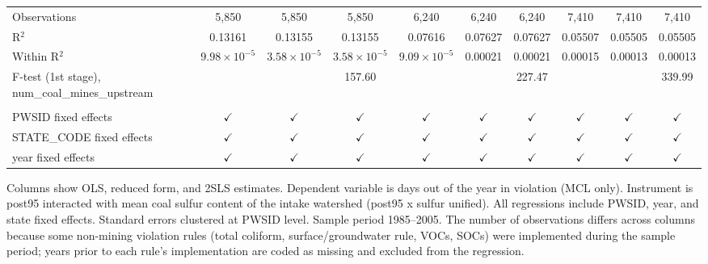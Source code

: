 \begin{table}[htbp]
\begin{adjustbox}{width = \textwidth, center}
\begin{tabular}{lccccccccc}
         Observations                                      & 5,850                 & 5,850                 & 5,850                 & 6,240                 & 6,240         & 6,240         & 7,410         & 7,410         & 7,410\\  
         R$^2$                                             & 0.13161               & 0.13155               & 0.13155               & 0.07616               & 0.07627       & 0.07627       & 0.05507       & 0.05505       & 0.05505\\  
         Within R$^2$                                      & $9.98\times 10^{-5}$  & $3.58\times 10^{-5}$  & $3.58\times 10^{-5}$  & $9.09\times 10^{-5}$  & 0.00021       & 0.00021       & 0.00015       & 0.00013       & 0.00013\\  
         F-test (1st stage), num\_coal\_mines\_upstream    &                       &                       & 157.60                &                       &               & 227.47        &               &               & 339.99\\  
         
          \\
         
         PWSID fixed effects                               & $\checkmark$          & $\checkmark$          & $\checkmark$          & $\checkmark$          & $\checkmark$  & $\checkmark$  & $\checkmark$  & $\checkmark$  & $\checkmark$\\   
         STATE\_CODE fixed effects                         & $\checkmark$          & $\checkmark$          & $\checkmark$          & $\checkmark$          & $\checkmark$  & $\checkmark$  & $\checkmark$  & $\checkmark$  & $\checkmark$\\   
         year fixed effects                                & $\checkmark$          & $\checkmark$          & $\checkmark$          & $\checkmark$          & $\checkmark$  & $\checkmark$  & $\checkmark$  & $\checkmark$  & $\checkmark$\\   
         
         \bottomrule
         
      \end{tabular}
      
      
      
   \end{adjustbox}
      {\tiny\linespread{1}\selectfont \par \raggedright 
   Columns show OLS, reduced form, and 2SLS estimates. Dependent variable is days out of the year in violation (MCL only). Instrument is post95 interacted with mean coal sulfur content of the intake watershed (post95 x sulfur unified). All regressions include PWSID, year, and state fixed effects. Standard errors clustered at PWSID level. Sample period 1985--2005. The number of observations differs across columns because some non-mining violation rules (total coliform, surface/groundwater rule, VOCs, SOCs) were implemented during the sample period; years prior to each rule's implementation are coded as missing and excluded from the regression.}
   
\end{table}


